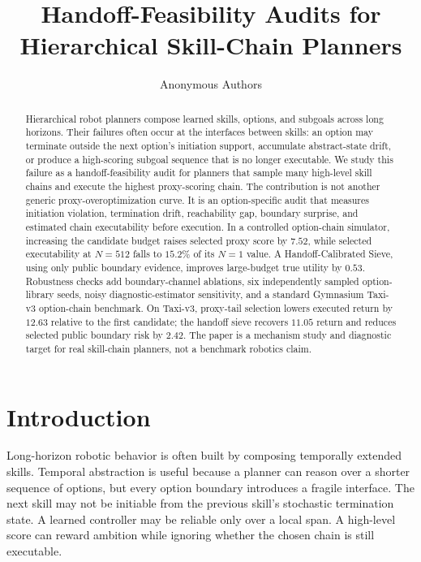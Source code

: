 \documentclass{article}
\title{Handoff-Feasibility Audits for Hierarchical Skill-Chain Planners}
\author{Anonymous Authors}
\begin{document}
\maketitle

\begin{abstract}
Hierarchical robot planners compose learned skills, options, and subgoals across long horizons. Their failures often occur at the interfaces between skills: an option may terminate outside the next option's initiation support, accumulate abstract-state drift, or produce a high-scoring subgoal sequence that is no longer executable. We study this failure as a handoff-feasibility audit for planners that sample many high-level skill chains and execute the highest proxy-scoring chain. The contribution is not another generic proxy-overoptimization curve. It is an option-specific audit that measures initiation violation, termination drift, reachability gap, boundary surprise, and estimated chain executability before execution. In a controlled option-chain simulator, increasing the candidate budget raises selected proxy score by \(7.52\), while selected executability at \(N=512\) falls to \(15.2\%\) of its \(N=1\) value. A Handoff-Calibrated Sieve, using only public boundary evidence, improves large-budget true utility by \(0.53\). Robustness checks add boundary-channel ablations, six independently sampled option-library seeds, noisy diagnostic-estimator sensitivity, and a standard Gymnasium Taxi-v3 option-chain benchmark. On Taxi-v3, proxy-tail selection lowers executed return by \(12.63\) relative to the first candidate; the handoff sieve recovers \(11.05\) return and reduces selected public boundary risk by \(2.42\). The paper is a mechanism study and diagnostic target for real skill-chain planners, not a benchmark robotics claim.
\end{abstract}

\section{Introduction}

Long-horizon robotic behavior is often built by composing temporally extended skills. Temporal abstraction is useful because a planner can reason over a shorter sequence of options, but every option boundary introduces a fragile interface. The next skill may not be initiable from the previous skill's stochastic termination state. A learned controller may be reliable only over a local span. A high-level score can reward ambition while ignoring whether the chosen chain is still executable.
\end{document}

